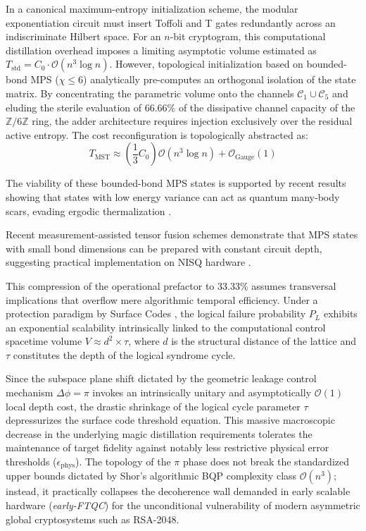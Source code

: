 \documentclass[12pt,a4paper]{article}
\theoremstyle{plain}
\theoremstyle{definition}
\theoremstyle{remark}
\begin{document}
In a canonical maximum-entropy initialization scheme, the modular exponentiation circuit must insert Toffoli and T gates redundantly across an indiscriminate Hilbert space. For an $n$-bit cryptogram, this computational distillation overhead imposes a limiting asymptotic volume estimated as $T_{\text{std}} = C_0 \cdot \mathcal{O}(n^3 \log n)$. However, topological initialization based on bounded-bond MPS ($\chi \le 6$) analytically pre-computes an orthogonal isolation of the state matrix. By concentrating the parametric volume onto the channels $\mathcal{C}_1 \cup \mathcal{C}_5$ and eluding the sterile evaluation of $66.66\%$ of the dissipative channel capacity of the $\mathbb{Z}/6\mathbb{Z}$ ring, the adder architecture requires injection exclusively over the residual active entropy. The cost reconfiguration is topologically abstracted as:
\begin{equation}
T_{\text{MST}} \approx \left(\frac{1}{3} C_0 \right) \mathcal{O}(n^3 \log n) + \mathcal{O}_{\text{Gauge}}(1)
\label{eq:toffoli_reduction}
\end{equation}

The viability of these bounded-bond MPS states is supported by recent results showing that states with low energy variance can act as quantum many-body scars, evading ergodic thermalization \cite{Rai2024}.

Recent measurement-assisted tensor fusion schemes demonstrate that MPS states with small bond dimensions can be prepared with constant circuit depth, suggesting practical implementation on NISQ hardware \cite{Stephen2025}.

This compression of the operational prefactor to $33.33\%$ assumes transversal implications that overflow mere algorithmic temporal efficiency. Under a protection paradigm by Surface Codes \cite{Fowler2012}, the logical failure probability $P_L$ exhibits an exponential scalability intrinsically linked to the computational control spacetime volume $V \approx d^2 \times \tau$, where $d$ is the structural distance of the lattice and $\tau$ constitutes the depth of the logical syndrome cycle.

Since the subspace plane shift dictated by the geometric leakage control mechanism $\Delta\phi = \pi$ invokes an intrinsically unitary and asymptotically $\mathcal{O}(1)$ local depth cost, the drastic shrinkage of the logical cycle parameter $\tau$ depressurizes the surface code threshold equation. This massive macroscopic decrease in the underlying magic distillation requirements tolerates the maintenance of target fidelity against notably less restrictive physical error thresholds ($\epsilon_{\text{phys}}$). The topology of the $\pi$ phase does not break the standardized upper bounds dictated by Shor's algorithmic BQP complexity class $\mathcal{O}(n^3)$; instead, it practically collapses the decoherence wall demanded in early scalable hardware (\textit{early-FTQC}) for the unconditional vulnerability of modern asymmetric global cryptosystems such as RSA-2048.
\end{document}

